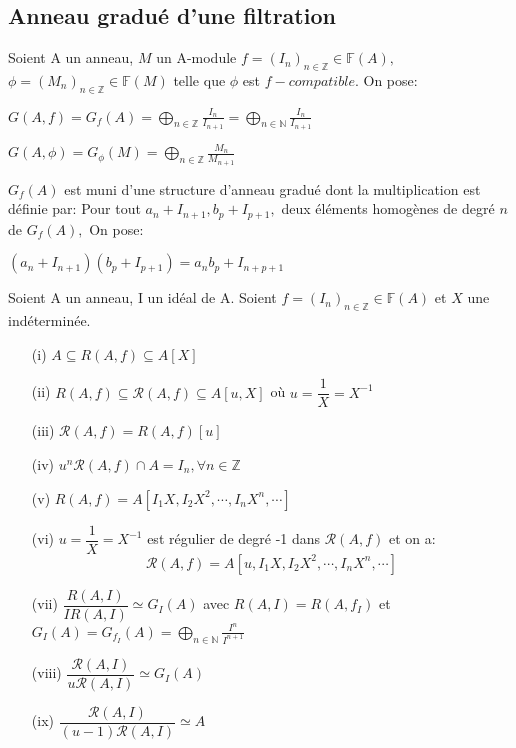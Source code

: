 \subsection{Anneau gradué d'une filtration}
\begin{madefinition}
	Soient A un anneau, $M$ un A-module
	$f=(I_{n})_{n\in \mathbb{Z}}\in \mathbb{F}(A),$ $\phi =(M_{n})_{n\in \mathbb{Z}}\in \mathbb{F}(M)$ telle que $\phi $ est $f-compatible$. On pose:
	
	$G(A,f)= G_{f}(A)=\displaystyle \bigoplus_{n \in \mathbb{Z}}{\frac{I_{n}}{I_{n+1}}} = \displaystyle \bigoplus_{n \in \mathbb{N}}{\frac{I_{n}}{I_{n+1}}} $
	
	$G(A, \phi)=G_{\phi }(M)=\displaystyle \bigoplus_{n \in \mathbb{Z}}{\frac{M_{n}}{M_{n+1}}}$
	
	$G_{f}(A)$ est muni d'une structure d'anneau gradué dont la multiplication est définie par:
	Pour tout $a_{n}+I_{n+1},b_{p}+I_{p+1},$ deux éléments homogènes de degré $n$ de $G_{f}(A),$ On pose:
	
	$(a_{n}+I_{n+1})(b_{p}+I_{p+1})=a_{n}b_{p}+I_{n+p+1}$
\end{madefinition}
\begin{maproposition}
	Soient A un anneau, I un idéal de A. Soient $f = (I_n)_{n \in \mathbb{Z}} \in \mathbb{F}(A)$ et $X$ une indéterminée.
	\begin{enumerate}
		\item[(i)] $A \subseteq R(A,f) \subseteq A[X]$
		\item[(ii)] $R(A,f) \subseteq \mathcal{R}(A,f) \subseteq A[u,X]$ où $u = \dfrac{1}{X} = X^{-1}$
		\item[(iii)] $\mathcal{R}(A,f) = R(A,f)[u] $
		\item[(iv)] $u^n\mathcal{R}(A,f) \cap  A = I_n, \forall n \in \mathbb{Z}$
		\item[(v)] $R(A,f) = A[I_1X,I_2X^2, \cdots, I_nX^n, \cdots] $
		\item[(vi)] $u=\dfrac{1}{X} = X ^{-1}$ est régulier de degré -1 dans $\mathcal{R}(A,f)$ et on a: \[ \mathcal{R}(A,f) = A[u,I_1X,I_2X^2, \cdots, I_nX^n, \cdots ] \]
		\item[(vii)] $ \dfrac{R(A,I)}{IR(A,I)} \simeq G_I(A) $ avec $R(A,I) = R(A, f_I) $ et $G_I(A) = G_{f_{I}}(A) = \displaystyle \bigoplus_{n \in \mathbb{N}}{\frac{I^{n}}{I^{n+1}}} $
		\item[(viii)] $ \dfrac{\mathcal{R}(A,I)}{u\mathcal{R}(A,I)} \simeq G_I(A) $
		\item[(ix)] $ \dfrac{\mathcal{R}(A,I)}{(u-1)\mathcal{R}(A,I)} \simeq A $
	\end{enumerate} 
\end{maproposition}
